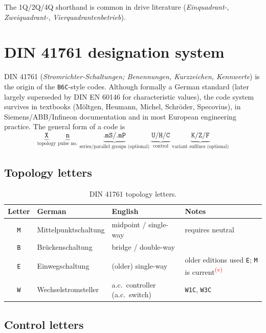 \documentclass[11pt,a4paper]{article}
\newcommand{\code}[1]{\texttt{#1}}
\newcommand{\verify}{\textsuperscript{\textcolor{red}{(v)}}}
\begin{document}
The 1Q/2Q/4Q shorthand is common in drive literature (\emph{Einquadrant-}, \emph{Zweiquadrant-}, \emph{Vierquadrantenbetrieb}).

\section{DIN 41761 designation system}

DIN 41761 (\emph{Stromrichter-Schaltungen; Benennungen, Kurzzeichen, Kennwerte}) is the origin of the \code{B6C}-style codes. Although formally a German standard (later largely superseded by DIN EN 60146 for characteristic values), the code system survives in textbooks (Möltgen, Heumann, Michel, Schröder, Specovius), in Siemens/ABB/Infineon documentation and in most European engineering practice. The general form of a code is
\[
\underbrace{\code{X}}_{\text{topology}}\;
\underbrace{\code{n}}_{\text{pulse no.}}\;
\underbrace{\code{.mS/.mP}}_{\text{series/parallel groups (optional)}}\;
\underbrace{\code{U/H/C}}_{\text{control}}\;
\underbrace{\code{K/Z/F}}_{\text{variant suffixes (optional)}}
\]

\subsection{Topology letters}

\begin{table}[htb]
\centering
\caption{DIN 41761 topology letters.}
\begin{tabular}{clp{3.2cm}p{5.5cm}}
\toprule
Letter & German & English & Notes \\
\midrule
\code{M} & Mittelpunktschaltung & midpoint / single-way & requires neutral \\
\code{B} & Brückenschaltung & bridge / double-way & \\
\code{E} & Einwegschaltung & (older) single-way & older editions used \code{E}; \code{M} is current\verify \\
\code{W} & Wechselstromsteller & a.c.\ controller (a.c.\ switch) & \code{W1C}, \code{W3C} \\
\bottomrule
\end{tabular}
\end{table}

\subsection{Control letters}
\end{document}
